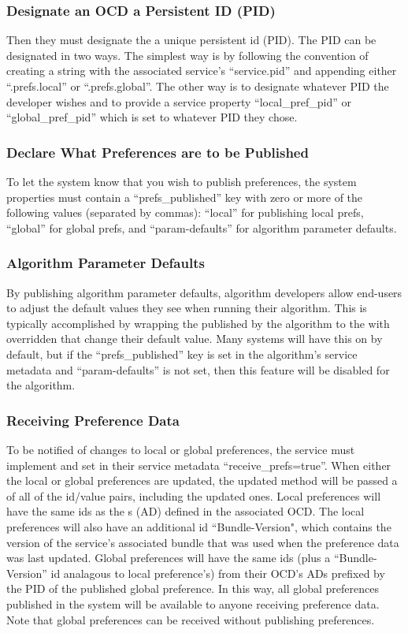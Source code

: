 \subsubsection*{Designate an OCD a Persistent ID (PID)} Then they must designate
the  a unique persistent id (PID). The PID can be
designated in two ways. The simplest way is by following the convention of
creating a string with the associated service's ``service.pid'' and appending
either ``.prefs.local'' or ``.prefs.global''. The other way is to designate
whatever PID the developer wishes and to provide a service property
``local\_pref\_pid'' or ``global\_pref\_pid'' which is set to whatever PID they
chose.

\subsubsection*{Declare What Preferences are to be Published} To let the system
know that you wish to publish preferences, the system properties must contain a
``prefs\_published'' key with zero or more of the following values (separated by
commas): ``local'' for publishing local prefs, ``global'' for global prefs, and
``param-defaults'' for algorithm parameter defaults.

\subsubsection*{Algorithm Parameter Defaults} By publishing algorithm parameter
defaults, algorithm developers allow end-users to adjust the default values they
see when running their algorithm. This is typically accomplished by wrapping the
 published by the algorithm to the
 with overridden  that
change their default value. Many systems will have this on by default, but if
the ``prefs\_published'' key is set in the algorithm's service metadata and
``param-defaults'' is not set, then this feature will be disabled for the
algorithm.

\subsubsection*{Receiving Preference Data} To be notified of changes to local or
global preferences, the service must implement
 and set in their service
metadata ``receive\_prefs=true''. When either the local or global preferences are
updated, the updated method will be passed a  of all of the
id/value pairs, including the updated ones. Local preferences will have the same
ids as the s (AD) defined in the associated OCD. The
local preferences will also have an additional id ``Bundle-Version", which
contains the version of the service's associated bundle that was used when the
preference data was last updated. Global preferences will have the same ids (plus
a ``Bundle-Version'' id analagous to local preference's) from their OCD's ADs
prefixed by the PID of the published global preference. In this way, all global
preferences published in the system will be available to anyone receiving
preference data. Note that global preferences can be received without publishing
preferences.
